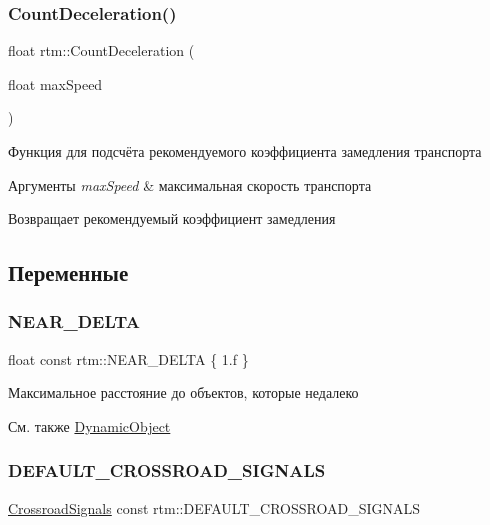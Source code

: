 \subsubsection{\texorpdfstring{Count\+Deceleration()}{CountDeceleration()}}
{\footnotesize\ttfamily float rtm\+::\+Count\+Deceleration (\begin{DoxyParamCaption}\item[{float}]{max\+Speed }\end{DoxyParamCaption})}

Функция для подсчёта рекомендуемого коэффициента замедления транспорта 
\begin{DoxyParams}{Аргументы}
{\em max\+Speed} & максимальная скорость транспорта \\
\hline
\end{DoxyParams}
\begin{DoxyReturn}{Возвращает}
рекомендуемый коэффициент замедления 
\end{DoxyReturn}


\subsection{Переменные}
\mbox{\label{namespacertm_ac6b72ea86e31b2b9ba35f29964ce0f5d}} 
\subsubsection{\texorpdfstring{N\+E\+A\+R\+\_\+\+D\+E\+L\+TA}{NEAR\_DELTA}}
{\footnotesize\ttfamily float const rtm\+::\+N\+E\+A\+R\+\_\+\+D\+E\+L\+TA \{ 1.f \}}

Максимальное расстояние до объектов, которые недалеко \begin{DoxySeeAlso}{См. также}
\hyperlink{classrtm_1_1_dynamic_object}{Dynamic\+Object} 
\end{DoxySeeAlso}
\mbox{\label{namespacertm_ac3892e23135322d9026ef00af1a76344}} 
\subsubsection{\texorpdfstring{D\+E\+F\+A\+U\+L\+T\+\_\+\+C\+R\+O\+S\+S\+R\+O\+A\+D\+\_\+\+S\+I\+G\+N\+A\+LS}{DEFAULT\_CROSSROAD\_SIGNALS}}
{\footnotesize\ttfamily \hyperlink{namespacertm_afa6df86cef8e2ebcc053ad994e440354}{Crossroad\+Signals} const rtm\+::\+D\+E\+F\+A\+U\+L\+T\+\_\+\+C\+R\+O\+S\+S\+R\+O\+A\+D\+\_\+\+S\+I\+G\+N\+A\+LS}


